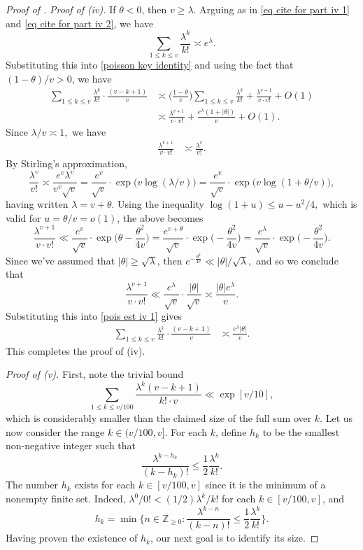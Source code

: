 \documentclass{amsart}
\theoremstyle{definition}
\numberwithin{equation}{section}
\begin{document}
\begin{proof}[Proof of ]
	\medskip\noindent\textit{Proof of (iv).} If $\theta < 0$, then $v \geq \lambda$. Arguing as in \eqref{eq cite for part iv 1} and \eqref{eq cite for part iv 2}, we have
	$$\sum_{1 \leq k \leq v}\frac{\lambda^k}{k!} \asymp e^\lambda.$$
	Substituting this into \eqref{poisson key identity} and using the fact that $(1-\theta)/v > 0$, we have
	\begin{align}
		\sum_{1 \leq k \leq v}\frac{\lambda^k}{k!}\cdot\frac{(v-k+1)}{v} &\asymp \bigg(\frac{1-\theta}{v}\bigg)\sum_{1 \leq k \leq  v}\frac{\lambda^k}{k!} + \frac{\lambda^{v+1}}{v\cdot v!} + O(1)\nonumber\\
		&\asymp \frac{\lambda^{v+1}}{v\cdot v!} + \frac{e^\lambda(1+|\theta|)}{v} +O(1). \label{pois est iv 1}
	\end{align}
	Since $\lambda/v \asymp 1,$ we have	\begin{align}
		\frac{\lambda^{v+1}}{v\cdot v!} &\asymp \frac{\lambda^v}{v!}.
	\end{align}
	By Stirling's approximation,
	$$\frac{\lambda^v}{v!} \asymp \frac{e^v \lambda^v}{v^v \sqrt{v}} = \frac{e^v }{\sqrt{v}} \cdot \exp\big(v \log (\lambda/v)\big) = \frac{e^v }{\sqrt{v}} \cdot \exp\big(v \log (1+\theta/v)\big),$$
	having written $\lambda = v+\theta.$ Using the inequality $\log(1+u) \leq u - u^2/4,$ which is valid for $u = \theta/v = o(1)$, the above becomes
	$$\frac{\lambda^{v+1}}{v\cdot v!} \ll \frac{e^v }{\sqrt{v}} \cdot \exp\bigg(\theta - \frac{\theta^2}{4v}\bigg) = \frac{e^{v+\theta} }{\sqrt{v}} \cdot \exp\bigg(- \frac{\theta^2}{4v}\bigg) = \frac{e^\lambda }{\sqrt{v}} \cdot \exp\bigg( - \frac{\theta^2}{4v}\bigg).$$
	Since we've assumed that $|\theta| \ge \sqrt{\lambda}$, then $e^{- \frac{\theta^2}{4v}} \ll |\theta|/\sqrt{\lambda},$ and so we conclude that
	$$\frac{\lambda^{v+1}}{v\cdot v!} \ll \frac{e^\lambda }{\sqrt{v}} \cdot \frac{|\theta|}{\sqrt{v}} \asymp \frac{|\theta| e^\lambda}{v}.$$
	Substituting this into \eqref{pois est iv 1} gives
	\begin{align*}
		\sum_{1 \leq k \leq v}\frac{\lambda^k}{k!}\cdot\frac{(v-k+1)}{v} &\asymp \frac{e^\lambda|\theta|}{v}.
	\end{align*}
	This completes the proof of (iv).
	
	\medskip\noindent\textit{Proof of (v).} First, note the trivial bound
	$$ \sum_{1 \leq k \le v/100} \frac{\lambda^k (v-k+1)}{k! \cdot v} \ll \exp[v/10], $$
	which is considerably smaller than the claimed size of the full sum over $k$. Let us now consider the range $k \in (v/100,v]$. For each $k$, define $h_k$ to be the smallest non-negative integer such that 
	$$ \frac{\lambda^{k-h_k}}{(k-h_k)!} \leq \frac{1}{2} \frac{\lambda^k}{k!}. $$
	The number $h_k$ exists for each $k \in [v/100,v]$ since it is the minimum of a nonempty finite set. Indeed, $\lambda^0/0! < (1/2) \lambda^k/k!$ for each $k \in [v/100,v]$, and
	$$ h_k = \min \bigg\{n \in \mathbb{Z}_{\geq 0}: \frac{\lambda^{k-n}}{(k-n)!} \leq \frac{1}{2} \frac{\lambda^k}{k!}\bigg\}. $$
	Having proven the existence of $h_k$, our next goal is to identify its size. 
	

\end{proof}
\end{document}
